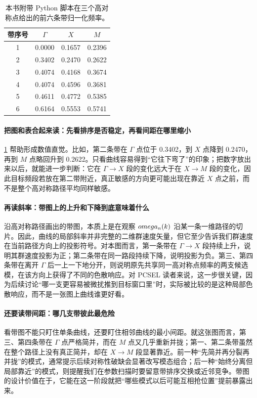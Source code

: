 \begin{table}[htbp]
  \centering
  \small
  \caption{本书附带 Python 脚本在三个高对称点给出的前六条带归一化频率。}
  \label{tab:pwem_python_highsym}
  \begin{tabular}{cccc}
    \toprule
    带序号 & $\Gamma$ & $X$ & $M$ \\
    \midrule
    1 & 0.0000 & 0.1657 & 0.2396 \\
    2 & 0.3402 & 0.2470 & 0.2622 \\
    3 & 0.4074 & 0.4168 & 0.3674 \\
    4 & 0.4074 & 0.4596 & 0.3681 \\
    5 & 0.4611 & 0.4772 & 0.5385 \\
    6 & 0.6164 & 0.5553 & 0.5741 \\
    \bottomrule
  \end{tabular}
\end{table}

\paragraph{把图和表合起来读：先看排序是否稳定，再看间距在哪里缩小}
\cref{tab:pwem_python_highsym} 帮助形成数值直觉。比如，第二条带在 $\Gamma$ 点位于 0.3402，到 $X$ 点降到 0.2470，再到 $M$ 点略回升到 0.2622。只看曲线容易得到“它往下弯了”的印象；把数字放出来以后，就能进一步判断：它在 $\Gamma\rightarrow X$ 段的变化远大于在 $X\rightarrow M$ 段的变化，因此目标频段若放在第二带附近，真正敏感的方向更可能出现在靠近 $X$ 点之前，而不是整个高对称路径平均同样敏感。

\paragraph{再读斜率：带图上的上升和下降到底意味着什么}
沿高对称路径画出的带图，本质上是在观察 $omega_n(k)$ 沿某一条一维路径的切片。因此，曲线的局部斜率并非完整的二维群速度矢量，但它至少告诉我们群速度在当前路径方向上的投影符号。对本图而言，第一条带在 $\Gamma\rightarrow X$ 段持续上升，说明其群速度投影为正；第二条带在同一路段持续下降，说明投影为负。第三、第四条带在离开 $\Gamma$ 后一上一下地分开，则说明原先共享同一高对称点频率的两支候选模，在该方向上获得了不同的色散响应。对 PCSEL 读者来说，这一步很关键，因为后续讨论“哪一支更容易被微扰推到目标窗口里”时，实际被比较的是这种局部色散响应，而不是一张图上曲线谁更好看。

\paragraph{还要读带间距：哪几支带彼此最危险}
看带图不能只盯住单条曲线，还要盯住相邻曲线的最小间距。就这张图而言，第三、第四条带在 $\Gamma$ 点严格简并，而在 $M$ 点又几乎重新并拢；第一、第二条带虽然在整个路径上没有真正简并，却在 $X\rightarrow M$ 段显著靠近。前一种“先简并再分裂再并拢”的模式，通常提示后续对称性破缺会显著改写模态组合；后一种“始终分离但局部靠近”的模式，则提醒我们在参数扫描时要留意带排序交换或近邻竞争。带图的设计价值在于，它能在这一阶段就把“哪些模式以后可能互相抢位置”提前暴露出来。

